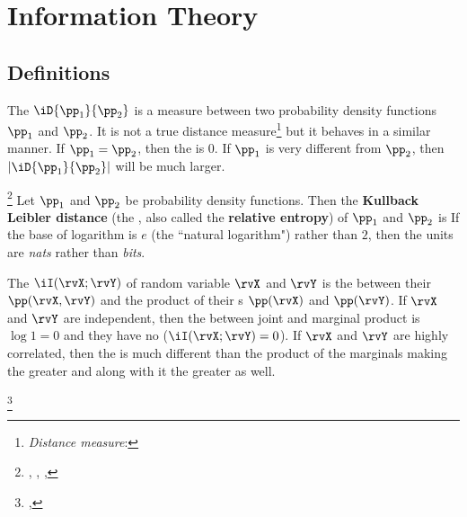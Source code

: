 \section{Information Theory}
\subsection{Definitions}
The  $\iD{\pp_1}{\pp_2}$  is a 
measure between two probability density functions $\pp_1$ and $\pp_2$.
It is not a true distance measure\footnote{
  {\em Distance measure}: 
  }
but it behaves in a similar manner.
If $\pp_1=\pp_2$, then the  is 0.
If $\pp_1$ is very different from $\pp_2$, then $|\iD{\pp_1}{\pp_2}|$ 
will be much larger.

\begin{definition}
\footnote{
  ,
  ,
  ,
  }
\label{def:kld}
Let $\pp_1$ and $\pp_2$ be probability density functions.
Then the {\bf Kullback Leibler distance}
(the , also called the {\bf relative entropy})
of $\pp_1$ and $\pp_2$ is
If the base of logarithm is $e$ (the ``natural logarithm") rather than $2$,
then the units are {\em nats} rather than {\em bits}.
\end{definition}

The  $\iI(\rvX;\rvY)$ of random variable $\rvX$ and $\rvY$ is
the  between their  $\pp(\rvX,\rvY)$ and the 
product of their s $\pp(\rvX)$ and $\pp(\rvY)$.
If $\rvX$ and $\rvY$ are independent, then the  between 
joint and marginal product is $\log1=0$ and they have no 
 ($\iI(\rvX;\rvY)=0$).
If $\rvX$ and $\rvY$ are highly correlated, then the  is
much different than the product of the marginals making the 
greater and along with it the  greater as well.
\begin{definition}
\footnote{
  ,
  }
\label{def:I(X;Y)}
\end{definition}

